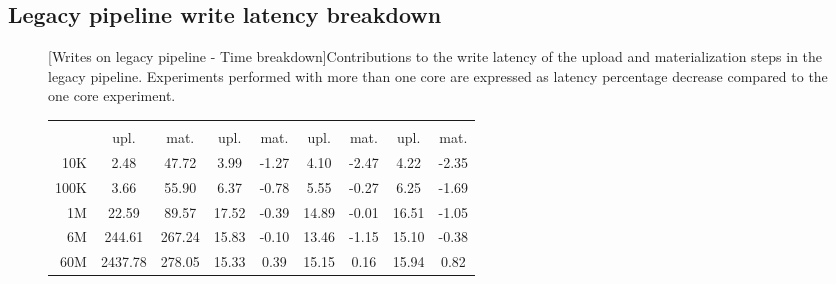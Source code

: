 \subsection{Legacy pipeline write latency breakdown}

\begin{figure}
    \centering
    \begin{minipage}[b]{\textwidth}
        [Writes on legacy pipeline - Time breakdown]{Contributions to the write latency of the upload and materialization steps in the legacy pipeline. Experiments performed with more than one  core are expressed as latency percentage decrease compared to the one  core experiment.}
        \label{tbl:hudi_virtualiz_breakdown_cpu_perc}
        \begin{tabular}{r S[table-format=4.2] S[table-format=4.2] S[table-format=2.2] S[table-format=2.2] S[table-format=2.2] S[table-format=2.2] S[table-format=2.2] S[table-format=2.2]} 
            \toprule
             &  &  &  & \\
            & {upl.} & {mat.} & {upl.} & {mat.} & {upl.} & {mat.} & {upl.} & {mat.}\\
            \midrule
            10K &  2.48 & 47.72 & 3.99 & -1.27 & 4.10 & -2.47 & 4.22 & -2.35\\
            100K & 3.66 & 55.90 & 6.37 & -0.78 & 5.55 & -0.27 & 6.25 & -1.69\\
            1M   & 22.59 & 89.57 & 17.52 & -0.39 & 14.89 & -0.01 & 16.51 & -1.05\\
            6M   & 244.61 & 267.24 & 15.83 & -0.10 & 13.46 & -1.15 & 15.10 & -0.38\\
            60M &  2437.78 & 278.05 & 15.33 & 0.39 & 15.15 & 0.16 & 15.94 & 0.82\\
            \bottomrule
        \end{tabular}
    \end{minipage}
    \begin{minipage}[b]{\textwidth}

\end{minipage}
\end{figure}
